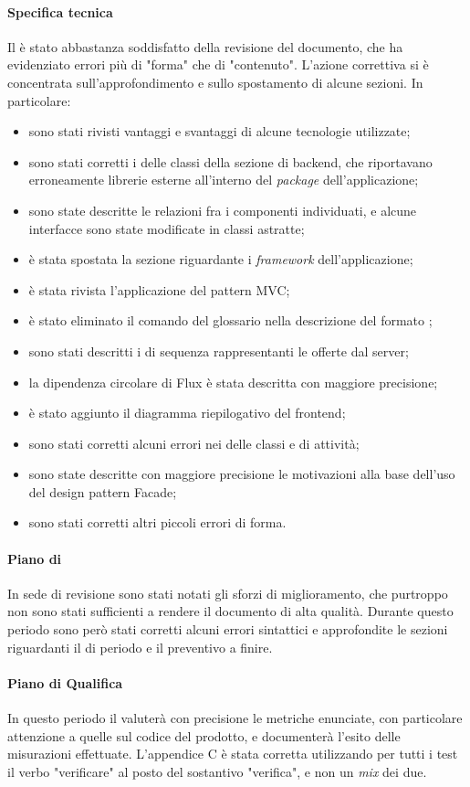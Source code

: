 \paragraph*{Specifica tecnica}
Il  è stato abbastanza soddisfatto della revisione del documento, che ha evidenziato errori più di "forma" che di "contenuto". L'azione correttiva si è concentrata sull'approfondimento e sullo spostamento di alcune sezioni. In particolare:
\begin{itemize}
\item sono stati rivisti vantaggi e svantaggi di alcune tecnologie utilizzate;
\item sono stati corretti i  delle classi della sezione di backend, che riportavano erroneamente librerie esterne all'interno del \textit{package} dell'applicazione;
\item sono state descritte le relazioni fra i componenti individuati, e alcune interfacce sono state modificate in classi astratte;
\item è stata spostata la sezione riguardante i \textit{framework} dell'applicazione;
\item è stata rivista l'applicazione del pattern MVC;
\item è stato eliminato il comando del glossario nella descrizione del formato ;
\item sono stati descritti i  di sequenza rappresentanti le  offerte dal server;
\item la dipendenza circolare di Flux è stata descritta con maggiore precisione;
\item è stato aggiunto il diagramma riepilogativo del frontend;
\item sono stati corretti alcuni errori nei  delle classi e di attività;
\item sono state descritte con maggiore precisione le motivazioni alla base dell'uso del design pattern Facade;
\item sono stati corretti altri piccoli errori di forma.
\end{itemize}

\paragraph*{Piano di }
In sede di revisione sono stati notati gli sforzi di miglioramento, che purtroppo non sono stati sufficienti a rendere il documento di alta qualità. Durante questo periodo sono però stati corretti alcuni errori sintattici e approfondite le sezioni riguardanti il  di periodo e il preventivo a finire.

\paragraph*{Piano di Qualifica}
In questo periodo il  valuterà con precisione le metriche enunciate, con particolare attenzione a quelle sul codice del prodotto, e documenterà l'esito delle misurazioni effettuate. L'appendice C è stata corretta utilizzando per tutti i test il verbo "verificare" al posto del sostantivo "verifica", e non un \textit{mix} dei due.
